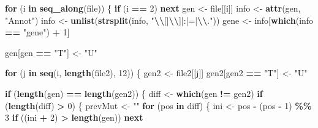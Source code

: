 \documentclass[
]{article}
\newenvironment{Shaded}{\begin{snugshade}}{\end{snugshade}}
\newcommand{\ControlFlowTok}[1]{\textcolor[rgb]{0.13,0.29,0.53}{\textbf{#1}}}
\newcommand{\DecValTok}[1]{\textcolor[rgb]{0.00,0.00,0.81}{#1}}
\newcommand{\FunctionTok}[1]{\textcolor[rgb]{0.13,0.29,0.53}{\textbf{#1}}}
\newcommand{\NormalTok}[1]{#1}
\newcommand{\OtherTok}[1]{\textcolor[rgb]{0.56,0.35,0.01}{#1}}
\newcommand{\SpecialCharTok}[1]{\textcolor[rgb]{0.81,0.36,0.00}{\textbf{#1}}}
\newcommand{\StringTok}[1]{\textcolor[rgb]{0.31,0.60,0.02}{#1}}
\begin{document}
\begin{Shaded}
\begin{Highlighting}[]
  \ControlFlowTok{for}\NormalTok{ (i }\ControlFlowTok{in} \FunctionTok{seq\_along}\NormalTok{(file)) \{}
    \ControlFlowTok{if}\NormalTok{ (i }\SpecialCharTok{==} \DecValTok{2}\NormalTok{) }\ControlFlowTok{next}
\NormalTok{    gen }\OtherTok{\textless{}{-}}\NormalTok{ file[[i]]}
\NormalTok{    info }\OtherTok{\textless{}{-}} \FunctionTok{attr}\NormalTok{(gen, }\StringTok{"Annot"}\NormalTok{)}
\NormalTok{    info }\OtherTok{\textless{}{-}} \FunctionTok{unlist}\NormalTok{(}\FunctionTok{strsplit}\NormalTok{(info, }\StringTok{"}\SpecialCharTok{\textbackslash{}\textbackslash{}}\StringTok{[|}\SpecialCharTok{\textbackslash{}\textbackslash{}}\StringTok{]|:|=|}\SpecialCharTok{\textbackslash{}\textbackslash{}}\StringTok{."}\NormalTok{))  }
\NormalTok{    gene }\OtherTok{\textless{}{-}}\NormalTok{ info[}\FunctionTok{which}\NormalTok{(info }\SpecialCharTok{==} \StringTok{"gene"}\NormalTok{) }\SpecialCharTok{+} \DecValTok{1}\NormalTok{]}
    
\NormalTok{    gen[gen }\SpecialCharTok{==} \StringTok{"T"}\NormalTok{] }\OtherTok{\textless{}{-}} \StringTok{"U"}
    
    \ControlFlowTok{for}\NormalTok{ (j }\ControlFlowTok{in} \FunctionTok{seq}\NormalTok{(i, }\FunctionTok{length}\NormalTok{(file2), }\DecValTok{12}\NormalTok{)) \{}
\NormalTok{      gen2 }\OtherTok{\textless{}{-}}\NormalTok{ file2[[j]]}
\NormalTok{      gen2[gen2 }\SpecialCharTok{==} \StringTok{"T"}\NormalTok{] }\OtherTok{\textless{}{-}} \StringTok{"U"}
      
      \ControlFlowTok{if}\NormalTok{ (}\FunctionTok{length}\NormalTok{(gen) }\SpecialCharTok{==} \FunctionTok{length}\NormalTok{(gen2)) \{}
\NormalTok{        diff }\OtherTok{\textless{}{-}} \FunctionTok{which}\NormalTok{(gen }\SpecialCharTok{!=}\NormalTok{ gen2)}
        \ControlFlowTok{if}\NormalTok{ (}\FunctionTok{length}\NormalTok{(diff) }\SpecialCharTok{\textgreater{}} \DecValTok{0}\NormalTok{) \{}
\NormalTok{          prevMut }\OtherTok{\textless{}{-}} \StringTok{""}
          \ControlFlowTok{for}\NormalTok{ (pos }\ControlFlowTok{in}\NormalTok{ diff) \{}
\NormalTok{            ini }\OtherTok{\textless{}{-}}\NormalTok{ pos }\SpecialCharTok{{-}}\NormalTok{ (pos }\SpecialCharTok{{-}} \DecValTok{1}\NormalTok{) }\SpecialCharTok{\%\%} \DecValTok{3}
            \ControlFlowTok{if}\NormalTok{ ((ini }\SpecialCharTok{+} \DecValTok{2}\NormalTok{) }\SpecialCharTok{\textgreater{}} \FunctionTok{length}\NormalTok{(gen)) }\ControlFlowTok{next}
            

\end{Highlighting}
\end{Shaded}
\end{document}
